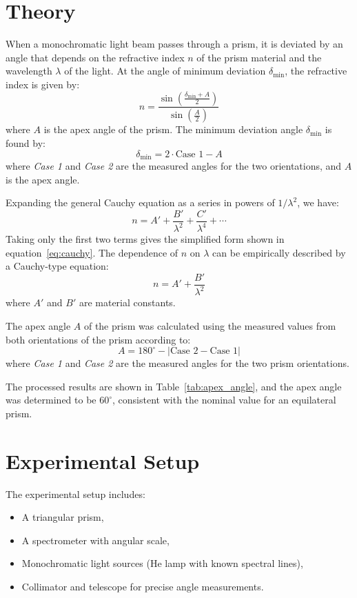 \documentclass[journal]{IEEEtran}
\begin{document}
\section*{Theory}
When a monochromatic light beam passes through a prism, it is deviated by an angle that depends on the refractive index \( n \) of the prism material and the wavelength \( \lambda \) of the light. At the angle of minimum deviation \( \delta_{\min} \), the refractive index is given by:
\begin{equation}
n = \frac{\sin\left(\frac{\delta_{\min} + A}{2}\right)}{\sin\left(\frac{A}{2}\right)}
\label{eq:refractive_index}
\end{equation}
where \( A \) is the apex angle of the prism.
The minimum deviation angle \( \delta_{\min} \) is found by:
\begin{equation}
\delta_{\min} = 2 \cdot \text{Case 1} - A
\end{equation}
where \textit{Case 1} and \textit{Case 2} are the measured angles for the two orientations, and \( A \) is the apex angle. 

Expanding the general Cauchy equation as a series in powers of \( 1/\lambda^2 \), we have:
\begin{equation}
n = A' + \frac{B'}{\lambda^2} + \frac{C'}{\lambda^4} + \cdots
\end{equation}
Taking only the first two terms gives the simplified form shown in equation~\eqref{eq:cauchy}.
The dependence of \( n \) on \( \lambda \) can be empirically described by a Cauchy-type equation:
\begin{equation}
n = A' + \frac{B'}{\lambda^2}
\label{eq:cauchy}
\end{equation}
where \( A' \) and \( B' \) are material constants.

The apex angle \( A \) of the prism was calculated using the measured values from both orientations of the prism according to:
\begin{equation}
A = 180^\circ - \left| \text{Case 2} - \text{Case 1} \right|
\end{equation}
where \textit{Case 1} and \textit{Case 2} are the measured angles for the two prism orientations. 

The processed results are shown in Table~\ref{tab:apex_angle}, and the apex angle was determined to be \( 60^\circ \), consistent with the nominal value for an equilateral prism.

\section{Experimental Setup}
The experimental setup includes:
\begin{itemize}
    \item A triangular prism,
    \item A spectrometer with angular scale,
    \item Monochromatic light sources (He lamp with known spectral lines),
    \item Collimator and telescope for precise angle measurements.
\end{itemize}
\end{document}
